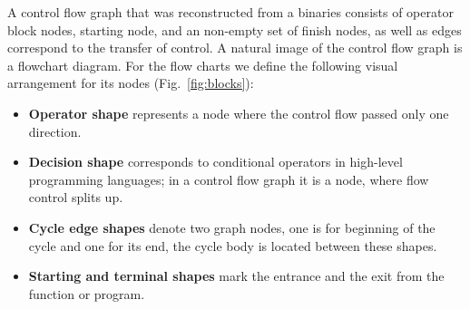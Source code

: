 \documentclass[conference]{IEEEtran}
\begin{document}
A control flow graph that was reconstructed from a binaries consists of operator block nodes, starting node, and an non-empty set of finish nodes, as well as edges correspond to the transfer of control.  A natural image of the control flow graph is a flowchart diagram.  For the flow charts we define the following visual arrangement for its nodes (Fig.~\ref{fig:blocks}):
\begin{itemize}
\item []\textbf{Operator shape} represents a node where the control flow passed only one direction.
\item []\textbf{Decision shape} corresponds to conditional operators in high-level programming languages; in a control flow graph it is a node, where flow control splits up.
\item []\textbf{Cycle edge shapes} denote two graph nodes, one is for beginning of the cycle and one for its end, the cycle body is located between these shapes.
\item []\textbf{Starting and terminal shapes} mark the entrance and the exit from the function or program.
\end{itemize}
\end{document}
